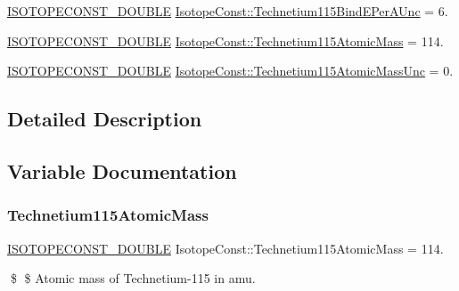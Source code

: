 \begin{DoxyCompactItemize}
\item 
\mbox{\hyperlink{group___isotope_const-_macros_ga8f45a7272ce02c0b4c65c44636ed719a}{I\+S\+O\+T\+O\+P\+E\+C\+O\+N\+S\+T\+\_\+\+D\+O\+U\+B\+LE}} \mbox{\hyperlink{group___isotope_const-_technetium-_tc115_ga80f50ea2ebb742d1a824a19d899a0169}{Isotope\+Const\+::\+Technetium115\+Bind\+E\+Per\+A\+Unc}} = 6.
\item 
\mbox{\hyperlink{group___isotope_const-_macros_ga8f45a7272ce02c0b4c65c44636ed719a}{I\+S\+O\+T\+O\+P\+E\+C\+O\+N\+S\+T\+\_\+\+D\+O\+U\+B\+LE}} \mbox{\hyperlink{group___isotope_const-_technetium-_tc115_ga1faff70a1037e4dc37c937f3c77902fd}{Isotope\+Const\+::\+Technetium115\+Atomic\+Mass}} = 114.
\item 
\mbox{\hyperlink{group___isotope_const-_macros_ga8f45a7272ce02c0b4c65c44636ed719a}{I\+S\+O\+T\+O\+P\+E\+C\+O\+N\+S\+T\+\_\+\+D\+O\+U\+B\+LE}} \mbox{\hyperlink{group___isotope_const-_technetium-_tc115_ga1f137479bae60ba0bbeec91e8b00f49d}{Isotope\+Const\+::\+Technetium115\+Atomic\+Mass\+Unc}} = 0.
\end{DoxyCompactItemize}


\subsection{Detailed Description}


\subsection{Variable Documentation}
\mbox{\label{group___isotope_const-_technetium-_tc115_ga1faff70a1037e4dc37c937f3c77902fd}} 
\subsubsection{\texorpdfstring{Technetium115\+Atomic\+Mass}{Technetium115AtomicMass}}
{\footnotesize\ttfamily \mbox{\hyperlink{group___isotope_const-_macros_ga8f45a7272ce02c0b4c65c44636ed719a}{I\+S\+O\+T\+O\+P\+E\+C\+O\+N\+S\+T\+\_\+\+D\+O\+U\+B\+LE}} Isotope\+Const\+::\+Technetium115\+Atomic\+Mass = 114.}

\$ \$ Atomic mass of Technetium-\/115 in amu. \mbox{\label{group___isotope_const-_technetium-_tc115_ga1f137479bae60ba0bbeec91e8b00f49d}} 
